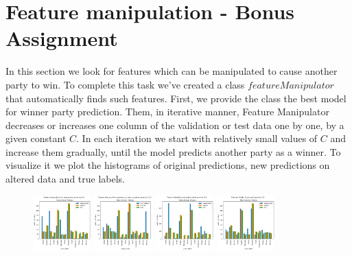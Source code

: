 \documentclass[12pt]{article}
\begin{document}
\newpage
\section{Feature manipulation - Bonus Assignment}
In this section we look for features which can be manipulated to cause another party to win. To complete this task we've created a class $featureManipulator$ that automatically finds such features. First, we provide the class the best model for winner party prediction. Them, in iterative manner, Feature Manipulator decreases or increases one column of the validation or test data one by one, by a given constant $C$. In each iteration we start with relatively small values of $C$ and increase them gradually, until the model predicts another party as a winner. To visualize it we plot the histograms of original predictions, new predictions on altered data and true labels.   

\begin{figure}[ht]
	\centering
	\includegraphics[width=0.2\textwidth]{dramatic_feature/Avg_education_importance_increased}
	\includegraphics[width=0.2\textwidth]{dramatic_feature/Avg_monthly_expense_on_pets_or_plants_increased}
	\includegraphics[width=0.2\textwidth]{dramatic_feature/Weighted_education_rank_increased}	
	\includegraphics[width=0.2\textwidth]{dramatic_feature/Yearly_ExpensesK_increased}					
\end{figure}
\end{document}
